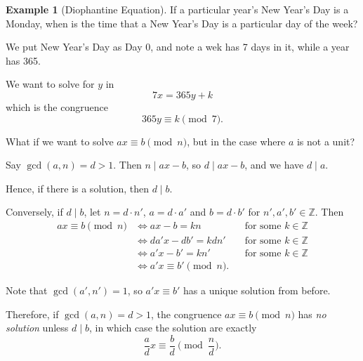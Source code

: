 \documentclass{article}
\theoremstyle{definition}
\newtheorem{example}[theorem]{Example}
\theoremstyle{remark}
\newcommand{\pqty}[1]{\left(#1\right)}
\newcommand{\divides}{\mid}
\newcommand{\ZZ}{\mathbb{Z}}
\begin{document}
\begin{example}[Diophantine Equation]
    If a particular year's New Year's Day is a Monday, when is the time that a New Year's Day is a particular day of the week?

    We put New Year's Day as Day 0, and note a wek has 7 days in it, while a year has 365.

    We want to solve for \(y\) in
    \[
        7x = 365y + k
    \]
    which is the congruence
    \[
        365y \equiv k \pmod{7}.
    \]
\end{example}

What if we want to solve \(ax \equiv b \pmod{n}\), but in the case where \(a\) is not a unit?

Say \(\gcd\pqty{a, n} = d > 1\). Then \(n \divides ax - b\), so \(d \divides ax - b\), and we have \(d \divides a\).

Hence, if there is a solution, then \(d \divides b\).

Conversely, if \(d \divides b\), let \(n = d \cdot n'\), \(a = d \cdot a'\) and \(b = d \cdot b'\) for \(n', a', b' \in \ZZ\). Then
\begin{align*}
    ax \equiv b \pmod{n} &\iff ax - b = kn && \text{for some } k \in \ZZ \\
    &\iff d a' x - d b' = k d n' && \text{for some } k \in \ZZ \\
    &\iff a' x - b' = k n' && \text{for some } k \in \ZZ \\
    &\iff a' x \equiv b' \pmod{n}.
\end{align*}

Note that \(\gcd\pqty{a', n'} = 1\), so \(a' x \equiv b'\) has a unique solution from before.

Therefore, if \(\gcd\pqty{a, n} = d > 1\), the congruence \(ax \equiv b \pmod{n}\) has \emph{no solution} unless \(d \divides b\), in which case the solution are exactly
\[
    \frac{a}{d} x \equiv \frac{b}{d} \pmod{\frac{n}{d}}.
\]
\end{document}
